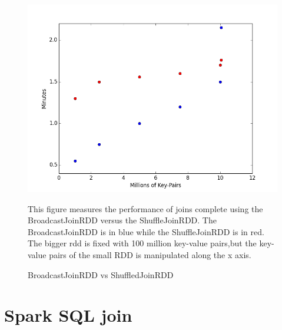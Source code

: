 \begin{figure}[h]
\begin{center}
\includegraphics[scale=0.6]{./img/rddjoin.png}
\caption{BroadcastJoinRDD vs ShuffledJoinRDD}
\label{fig:rddjoin}
\end{center}
This figure measures the performance of joins complete using the BroadcastJoinRDD versus the ShuffleJoinRDD.
The BroadcastJoinRDD is in blue while the ShuffleJoinRDD is in red. The bigger rdd is fixed with 100 million key-value pairs,but the 
key-value pairs of the small RDD is manipulated along the x axis.
\end{figure}

\section{Spark SQL join}
